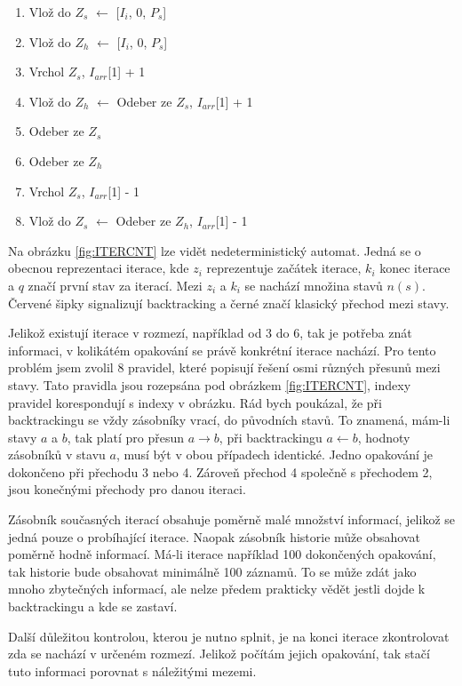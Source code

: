 \begin{enumerate}[label=\arabic* --]
	\item Vlož do $Z_s$ $\longleftarrow$ [$I_i$, 0, $P_s$]
	\item Vlož do $Z_h$ $\longleftarrow$ [$I_i$, 0, $P_s$]
	\item Vrchol $Z_s$, $I_{arr}$[1] + 1
	\item Vlož do $Z_h$ $\longleftarrow$ Odeber ze $Z_s$, $I_{arr}$[1] + 1
	\item Odeber ze $Z_s$
	\item Odeber ze $Z_h$
	\item Vrchol $Z_s$, $I_{arr}$[1] - 1
	\item Vlož do $Z_s$ $\longleftarrow$ Odeber ze $Z_h$, $I_{arr}$[1] - 1
\end{enumerate}

Na obrázku \ref{fig:ITERCNT} lze vidět nedeterministický automat. 
Jedná se o obecnou reprezentaci iterace, kde $z_i$ reprezentuje začátek iterace, $k_i$ konec iterace a $q$ značí první stav za iterací.
Mezi $z_i$ a $k_i$ se nachází množina stavů $n(s)$.
Červené šipky signalizují backtracking a černé značí klasický přechod mezi stavy.

Jelikož existují iterace v rozmezí, například od 3 do 6, tak je potřeba znát informaci, v kolikátém opakování se právě konkrétní iterace nachází.
Pro tento problém jsem zvolil 8 pravidel, které popisují řešení osmi různých přesunů mezi stavy.
Tato pravidla jsou rozepsána pod obrázkem \ref{fig:ITERCNT}, indexy pravidel korespondují s indexy v obrázku.
Rád bych poukázal, že při backtrackingu se vždy zásobníky vrací, do původních stavů. 
To znamená, mám-li stavy $a$ a $b$, tak platí pro přesun $a \rightarrow b$, při backtrackingu $a \leftarrow b$, hodnoty zásobníků v stavu $a$, musí být v obou případech identické.
Jedno opakování je dokončeno při přechodu 3 nebo 4. 
Zároveň přechod 4 společně s přechodem 2, jsou konečnými přechody pro danou iteraci.

Zásobník současných iterací obsahuje poměrně malé množství informací, jelikož se jedná pouze o probíhající iterace.
Naopak zásobník historie může obsahovat poměrně hodně informací. 
Má-li iterace například 100 dokončených opakování, tak historie bude obsahovat minimálně 100 záznamů.
To se může zdát jako mnoho zbytečných informací, ale nelze předem prakticky vědět jestli dojde k backtrackingu a kde se zastaví.

Další důležitou kontrolou, kterou je nutno splnit, je na konci iterace zkontrolovat zda se nachází v určeném rozmezí.
Jelikož počítám jejich opakování, tak stačí tuto informaci porovnat s náležitými mezemi.

